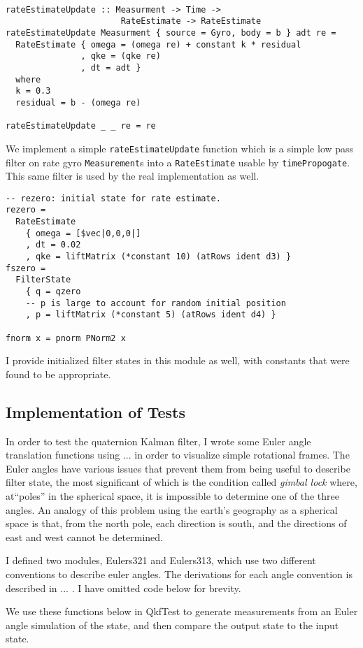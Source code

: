 \documentclass[12pt]{report}
\begin{document}
\begin{lstlisting}

rateEstimateUpdate :: Measurment -> Time -> 
                       RateEstimate -> RateEstimate
rateEstimateUpdate Measurment { source = Gyro, body = b } adt re = 
  RateEstimate { omega = (omega re) + constant k * residual
               , qke = (qke re)
               , dt = adt }
  where 
  k = 0.3
  residual = b - (omega re)

rateEstimateUpdate _ _ re = re 
\end{lstlisting}
We implement a simple \lstinline$rateEstimateUpdate$ function which is a simple low pass filter on rate gyro \lstinline$Measurement$s into a \lstinline$RateEstimate$ usable by \lstinline$timePropogate$. This same filter is used by the real implementation as well.
\begin{lstlisting}
-- rezero: initial state for rate estimate. 
rezero = 
  RateEstimate 
    { omega = [$vec|0,0,0|]
    , dt = 0.02
    , qke = liftMatrix (*constant 10) (atRows ident d3) }
fszero = 
  FilterState 
    { q = qzero
    -- p is large to account for random initial position
    , p = liftMatrix (*constant 5) (atRows ident d4) }

fnorm x = pnorm PNorm2 x
\end{lstlisting}
I provide initialized filter states in this module as well, with constants that were found to be appropriate.

\subsection{Implementation of Tests}
In order to test the quaternion Kalman filter, I wrote some Euler angle translation functions using ... in order to visualize simple rotational frames. The Euler angles have various issues that prevent them from being useful to describe filter state, the most significant of which is the condition called \emph{gimbal lock} where, at``poles'' in the spherical space, it is impossible to determine one of the three angles. An analogy of this problem using the earth's geography as a spherical space is that, from the north pole, each direction is south, and the directions of east and west cannot be determined.

I defined two modules, Eulers321 and Eulers313, which use two different conventions to describe euler angles. The derivations for each angle convention is described in ... . I have omitted code below for brevity.

We use these functions below in QkfTest to generate measurements from an Euler angle simulation of the state, and then compare the output state to the input state.
\end{document}

